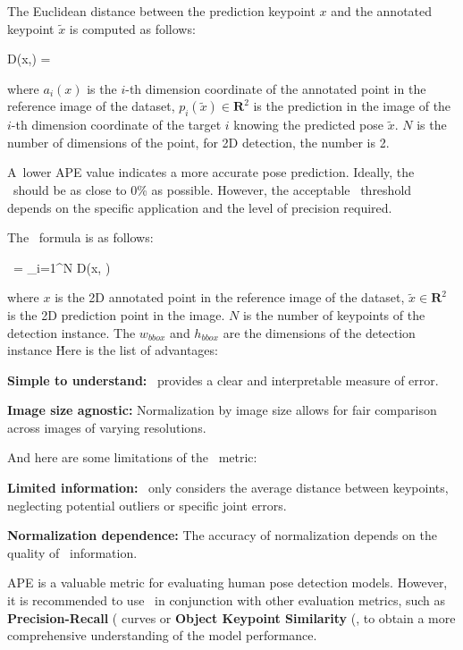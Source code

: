 The Euclidean distance between the prediction keypoint $ x $ and the annotated keypoint $ \tilde{x}$ is computed as follows:

\startplaceformula[reference=formula:euclidean-distance]
    \startformula D(x,) = 
    \stopformula
\stopplaceformula

where $ a_i (x) $ is the $ i $-th dimension coordinate of the annotated point in the reference image of the dataset, $ p_i (\tilde{x}) \in  \mathbf R^2 $ is the prediction in the image of the $ i $-th dimension coordinate of the target $ i $ knowing the predicted pose $ \tilde{x} $. $ N $ is the number of dimensions of the point, for 2D detection, the number is 2.

A~lower APE value indicates a more accurate pose prediction. Ideally, the \APE\ should be as close to 0\% as possible. However, the acceptable \APE\ threshold depends on the specific application and the level of precision required.

The \APE\ formula is as follows:

\startplaceformula[reference=formula:ape]
    \startformula \APE\ =  \sum_{i=1}^{N} D(x, ) 
    \stopformula
\stopplaceformula

where $ x $ is the 2D annotated point in the reference image of the dataset, $ \tilde{x} \in  \mathbf R^2 $ is the 2D prediction point in the image. $ N $ is the number of keypoints of the detection instance. The $ w_{bbox} $ and $ h_{bbox} $ are the dimensions of the detection instance \BBOX\.

Here is the list of advantages:
\startitemize[1]
    \item {\bf Simple to understand:} \APE\ provides a clear and interpretable measure of error.
    \item {\bf Image size agnostic:} Normalization by image size allows for fair comparison across images of varying resolutions.
\stopitemize

And here are some limitations of the \APE\ metric:
\startitemize[1]
    \item {\bf Limited information:} \APE\ only considers the average distance between keypoints, neglecting potential outliers or specific joint errors.
    \item {\bf Normalization dependence:} The accuracy of normalization depends on the quality of \BBOX\ information.
\stopitemize

APE is a valuable metric for evaluating human pose detection models. However, it is recommended to use \APE\ in conjunction with other evaluation metrics, such as {\bf Precision-Recall} (\PR\) curves or {\bf Object Keypoint Similarity} (\OKS\), to obtain a more comprehensive understanding of the model performance.

